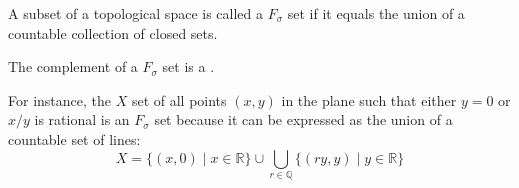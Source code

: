 \documentclass[12pt]{article}
\begin{document}
A subset of a topological space is called a $F_\sigma$ set if it equals the union of a countable collection of closed sets.  

The complement of a $F_\sigma$ set is a .

For instance, the $X$ set of all points $(x,y)$ in the plane such that either $y = 0$ or $x/y$ is rational is an $F_\sigma$ set because it can be expressed as the union of a countable set of lines:
 $$X = \{(x,0) \mid x \in \mathbb{R} \} \cup \bigcup_{r \in \mathbb{Q}} \{(ry,y) \mid y \in \mathbb{R}\}$$
\end{document}

